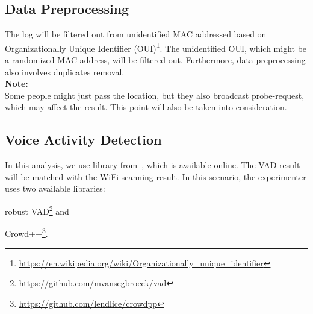 \documentclass{article}
\begin{document}
\subsection{Data Preprocessing} %
\label{sub:data_preprocessing}
The log will be filtered out from unidentified MAC addressed based on Organizationally Unique Identifier (OUI)\footnote{\url{https://en.wikipedia.org/wiki/Organizationally_unique_identifier}}. The unidentified OUI, which might be a randomized MAC address, will be filtered out. Furthermore, data preprocessing also involves duplicates removal.\\

\noindent
\textbf{Note:}\\
Some people might just pass the location, but they also broadcast probe-request, which may affect the result. This point will also be taken into consideration.

\subsection{Voice Activity Detection} %
\label{sub:voice_activity_detection}
In this analysis, we use library from~\cite{thesis070,thesis067}, which is available online. The VAD result will be matched with the WiFi scanning result. In this scenario, the experimenter uses two available libraries:
	\begin{enumerate*}[label={\alph*)}]
		\item robust VAD\footnote{\url{https://github.com/mvansegbroeck/vad}} and 
		\item Crowd++\footnote{\url{https://github.com/lendlice/crowdpp}}.
	\end{enumerate*}

\end{document}
